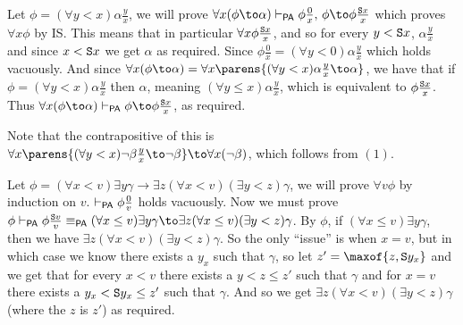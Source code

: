 \eexerc

\benum
    \item Let $\phi=(\forall y<x)\alpha\frac yx$, we will prove $\forall x(\phi\to\alpha)\vdash_{\sf PA}\phi\frac0x,\,\phi\to\phi\frac{{\tt S}x}x$ which proves $\forall x\phi$ by IS.
    This means that in particular $\forall x\phi\frac{{\tt S}x}x$, and so for every $y<{\tt S}x$, $\alpha\frac yx$ and since $x<{\tt S}x$ we get $\alpha$ as required.
    Since $\phi\frac0x=(\forall y<0)\alpha\frac yx$ which holds vacuously.
    And since $\forall x(\phi\to\alpha)=\forall x\parens{(\forall y<x)\alpha\frac yx\to\alpha}$, we have that if $\phi=(\forall y<x)\alpha\frac yx$ then $\alpha$, meaning $(\forall y\leq x)\alpha\frac yx$,
    which is equivalent to $\phi\frac{{\tt S}x}x$.
    Thus $\forall x(\phi\to\alpha)\vdash_{\sf PA}\phi\to\phi\frac{{\tt S}x}x$, as required.
    \item Note that the contrapositive of this is $\forall x\parens{(\forall y<x)\neg\beta\frac yx\to\neg\beta}\to\forall x(\neg\beta)$, which follows from $(1)$.
    \item Let $\phi=(\forall x<v)\exists y\gamma\to\exists z(\forall x<v)(\exists y<z)\gamma$, we will prove $\forall v\phi$ by induction on $v$.
    $\vdash_{\sf PA}\phi\frac 0v$ holds vacuously.
    Now we must prove $\phi\vdash_{\sf PA}\phi\frac{{\tt S}v}v\equiv_{\sf PA}(\forall x\leq v)\exists y\gamma\to\exists z(\forall x\leq v)(\exists y<z)\gamma$.
    By $\phi$, if $(\forall x\leq v)\exists y\gamma$, then we have $\exists z(\forall x<v)(\exists y<z)\gamma$.
    So the only ``issue'' is when $x=v$, but in which case we know there exists a $y_x$ such that $\gamma$, so let $z'=\maxof{z,{\tt S}y_x}$ and we get that for every $x<v$ there exists a $y<z\leq z'$ such
    that $\gamma$ and for $x=v$ there exists a $y_x<{\tt S}y_x\leq z'$ such that $\gamma$.
    And so we get $\exists z(\forall x<v)(\exists y<z)\gamma$ (where the $z$ is $z'$) as required.
\eenum

